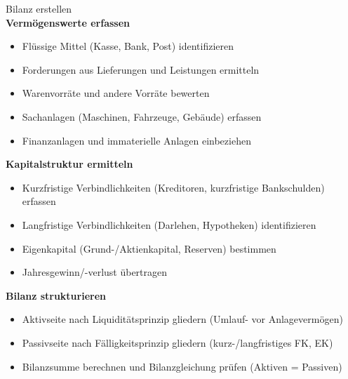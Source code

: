 \begin{KR}{Bilanz erstellen}\\
\textbf{Vermögenswerte erfassen}
\begin{itemize}
    \item Flüssige Mittel (Kasse, Bank, Post) identifizieren
    \item Forderungen aus Lieferungen und Leistungen ermitteln
    \item Warenvorräte und andere Vorräte bewerten
    \item Sachanlagen (Maschinen, Fahrzeuge, Gebäude) erfassen
    \item Finanzanlagen und immaterielle Anlagen einbeziehen
\end{itemize}

\textbf{Kapitalstruktur ermitteln}
\begin{itemize}
    \item Kurzfristige Verbindlichkeiten (Kreditoren, kurzfristige Bankschulden) erfassen
    \item Langfristige Verbindlichkeiten (Darlehen, Hypotheken) identifizieren
    \item Eigenkapital (Grund-/Aktienkapital, Reserven) bestimmen
    \item Jahresgewinn/-verlust übertragen
\end{itemize}

\textbf{Bilanz strukturieren}
\begin{itemize}
    \item Aktivseite nach Liquiditätsprinzip gliedern (Umlauf- vor Anlagevermögen)
    \item Passivseite nach Fälligkeitsprinzip gliedern (kurz-/langfristiges FK, EK)
    \item Bilanzsumme berechnen und Bilanzgleichung prüfen (Aktiven = Passiven)
\end{itemize}
\end{KR}

